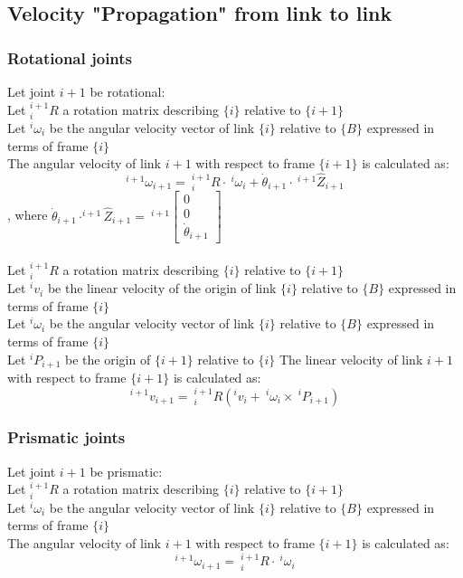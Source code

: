 \documentclass[10pt,a4paper]{article}
\newcommand{\vect}[1]{\ensuremath{\begin{bmatrix}#1\end{bmatrix}}}
\begin{document}
\subsection{Velocity "Propagation" from link to link}
\subsubsection{Rotational joints}
Let joint $i+1$ be rotational: \\

Let $^{i+1}_iR$ a rotation matrix describing $\{i\}$ relative to $\{i+1\}$ \\
Let $^i\omega_i$ be the angular velocity vector of link $\{i\}$ relative to $\{B\}$ expressed in terms of frame $\{i\}$ \\
The angular velocity of link $i + 1$ with respect to frame $\{i + 1\}$ is calculated as:
$$
^{i+1}\omega_{i+1} = ~^{i+1}_iR ⋅ ~^i\omega_i + \dot \theta_{i+1} ⋅ ~^{i+1}\hat{Z}_{i+1}
$$
, where $\dot \theta_{i+1} ⋅ ^{i+1}\hat{Z}_{i+1} = ~^{i+1}\vect{0 \\ 0 \\ \dot{\theta}_{i+1}}$ \\
\\

Let $^{i+1}_iR$ a rotation matrix describing $\{i\}$ relative to $\{i+1\}$ \\
Let $^iv_i$ be the linear velocity of the origin of link $\{i\}$ relative to $\{B\}$ expressed in terms of frame $\{i\}$ \\
Let $^i\omega_i$ be the angular velocity vector of link $\{i\}$ relative to $\{B\}$ expressed in terms of frame $\{i\}$ \\
Let $^iP_{i+1}$ be the origin of $\{i+1\}$ relative to $\{i\}$
The linear velocity of link $i + 1$ with respect to frame $\{i + 1\}$ is calculated as:
$$
^{i+1}v_{i+1} = ~^{i+1}_iR(^iv_i + ~^i\omega_i \times ~^iP_{i+1})
$$

\subsubsection{Prismatic joints}
Let joint $i+1$ be prismatic: \\

Let $^{i+1}_iR$ a rotation matrix describing $\{i\}$ relative to $\{i+1\}$ \\
Let $^i\omega_i$ be the angular velocity vector of link $\{i\}$ relative to $\{B\}$ expressed in terms of frame $\{i\}$ \\
The angular velocity of link $i + 1$ with respect to frame $\{i + 1\}$ is calculated as:
$$
^{i+1}\omega_{i+1} = ~^{i+1}_iR ⋅ ~^i\omega_i
$$
\end{document}
